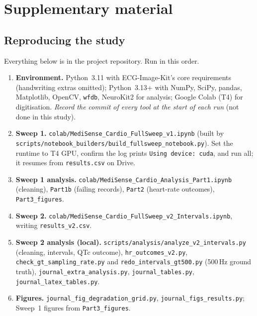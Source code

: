 \section{Supplementary material}

\subsection{Reproducing the study}\label{sec:repro}
Everything below is in the project repository. Run in this order.

\begin{enumerate}
\item \textbf{Environment.} Python~3.11 with ECG-Image-Kit's core requirements (handwriting extras omitted); Python~3.13+ with NumPy, SciPy, pandas, Matplotlib, OpenCV, \texttt{wfdb}, NeuroKit2 for analysis; Google Colab (T4) for digitisation. \emph{Record the commit of every tool at the start of each run} (not done in this study).
\item \textbf{Sweep 1.} \texttt{colab/MediSense\_Cardio\_FullSweep\_v1.ipynb} (built by \texttt{scripts/notebook\_builders/build\_fullsweep\_notebook.py}). Set the runtime to T4 GPU, confirm the log prints \texttt{Using device: cuda}, and run all; it resumes from \texttt{results.csv} on Drive.
\item \textbf{Sweep 1 analysis.} \texttt{colab/MediSense\_Cardio\_Analysis\_Part1.ipynb} (cleaning), \texttt{Part1b} (failing records), \texttt{Part2} (heart-rate outcomes), \texttt{Part3\_figures}.
\item \textbf{Sweep 2.} \texttt{colab/MediSense\_Cardio\_FullSweep\_v2\_Intervals.ipynb}, writing \texttt{results\_v2.csv}.
\item \textbf{Sweep 2 analysis (local).} \texttt{scripts/analysis/analyze\_v2\_intervals.py} (cleaning, intervals, QTc outcome), \texttt{hr\_outcomes\_v2.py}, \texttt{check\_gt\_sampling\_rate.py} and \texttt{redo\_intervals\_gt500.py} (500\,Hz ground truth), \texttt{journal\_extra\_analysis.py}, \texttt{journal\_tables.py}, \texttt{journal\_latex\_tables.py}.
\item \textbf{Figures.} \texttt{journal\_fig\_degradation\_grid.py}, \texttt{journal\_figs\_results.py}; Sweep~1 figures from \texttt{Part3\_figures}.
\end{enumerate}

